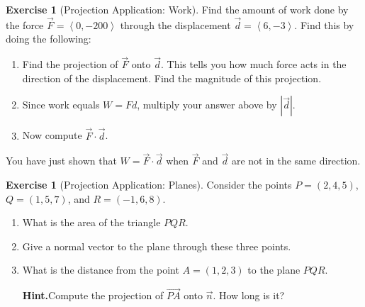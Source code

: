 \documentclass[10pt,]{book}
\theoremstyle{plain}
\theoremstyle{definition}
\theoremstyle{definition}
\theoremstyle{definition}
\theoremstyle{definition}
\newtheorem{exploration}[project]{Exercise}
\theoremstyle{definition}
\numberwithin{equation}{section}
\newcommand{\lt}{<}
\begin{document}
\begin{exploration}[Projection Application: Work]\label{first_work_problem}
Find the amount of work done by the force \(\vec F=\left\lt 0,-200\right>\) through the displacement \(\vec d=\left\lt 6,-3\right>\). Find this by doing the following:%
\begin{enumerate}[font=\bfseries,label=(\alph*),ref=\alph*]
\item\label{task-87} Find the projection of \(\vec F\) onto \(\vec d\). This tells you how much force acts in the direction of the displacement. Find the magnitude of this projection.%
\item\label{task-88} Since work equals \(W=Fd\), multiply your answer above by \(|\vec {d}|\).%
\item\label{task-89} Now compute \(\vec F\cdot \vec d\).%
\end{enumerate}
\bigbreak
You have just shown that \(W=\vec F\cdot \vec d\) when \(\vec F\) and \(\vec d\) are not in the same direction.%
\end{exploration}
\begin{exploration}[Projection Application: Planes]\label{exploration-53}
Consider the points \(P=(2,4,5)\), \(Q=(1,5,7)\), and \(R=(-1,6,8)\).%
\begin{enumerate}[font=\bfseries,label=(\alph*),ref=\alph*]
\item\label{task-90} What is the area of the triangle \(PQR\).%
\item\label{task-91} Give a normal vector to the plane through these three points.%
\item\label{task-92} What is the distance from the point \(A=(1,2,3)\) to the plane \(PQR\).%
\par\medskip\noindent%
\textbf{Hint.}\quad Compute the projection of \(\vec {PA}\) onto \(\vec n\). How long is it?%
\end{enumerate}
\end{exploration}
\typeout{************************************************}
\typeout{************************************************}
\end{document}
